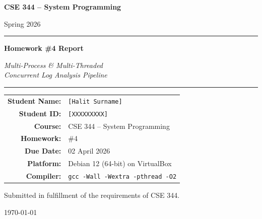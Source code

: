 \documentclass[11pt,a4paper]{article}
\newcommand{\code}[1]{\texttt{\small #1}}
\begin{document}
\begin{titlepage}
\centering
\vspace*{2cm}

{\Huge\bfseries\color{primary} CSE 344 -- System Programming \par}
\vspace{0.4cm}
{\Large Spring 2026 \par}

\vspace{2.5cm}
\rule{\textwidth}{1pt}
\vspace{0.5cm}

{\huge\bfseries Homework \#4 Report \par}
\vspace{0.6cm}
{\LARGE\itshape Multi-Process \& Multi-Threaded\\
Concurrent Log Analysis Pipeline \par}

\vspace{0.5cm}
\rule{\textwidth}{1pt}

\vspace{3cm}

\begin{tabular}{rl}
\textbf{Student Name:} & \texttt{[Halit Surname]} \\[6pt]
\textbf{Student ID:}   & \texttt{[XXXXXXXXX]} \\[6pt]
\textbf{Course:}       & CSE 344 -- System Programming \\[6pt]
\textbf{Homework:}     & \#4 \\[6pt]
\textbf{Due Date:}     & 02 April 2026 \\[6pt]
\textbf{Platform:}     & Debian 12 (64-bit) on VirtualBox \\[6pt]
\textbf{Compiler:}     & \code{gcc -Wall -Wextra -pthread -O2} \\
\end{tabular}

\vfill

{\large Submitted in fulfillment of the requirements of CSE 344. \par}
\vspace{0.5cm}
{\small \today \par}

\end{titlepage}

\setcounter{page}{1}
\tableofcontents
\thispagestyle{fancy}
\newpage
\end{document}

